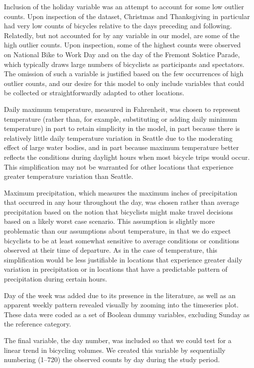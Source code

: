 \documentclass[12pt,letterpaper,article]{memoir} %
\begin{document}
Inclusion of the holiday variable was an attempt to account for
some low outlier counts. Upon inspection of the dataset, Christmas and
Thanksgiving in particular had very low counts of bicycles relative to
the days preceding and following. Relatedly, but not accounted for by
any variable in our model, are some of the high outlier counts. Upon
inspection, some of the highest counts were observed on National Bike
to Work Day and on the day of the Fremont Solstice Parade, which
typically draws large numbers of bicyclists as participants and
spectators. The omission of such a variable is justified based on the
few occurrences of high outlier counts, and our desire for this model
to only include variables that could be collected or straightforwardly
adapted to other locations.

Daily maximum temperature, measured in Fahrenheit, was chosen to
represent temperature (rather than, for example, substituting or
adding daily minimum temperature) in part to retain simplicity in the
model, in part because there is relatively little daily temperature
variation in Seattle due to the moderating effect of large water
bodies, and in part because maximum temperature better reflects the
conditions during daylight hours when most bicycle trips would occur.
This simplification may not be warranted for other locations that
experience greater temperature variation than Seattle.

Maximum precipitation, which measures the maximum inches of
precipitation that occurred in any hour throughout the day, was chosen
rather than average precipitation based on the notion that bicyclists
might make travel decisions based on a likely worst case scenario.
This assumption is slightly more problematic than our assumptions
about temperature, in that we do expect bicyclists to be at least
somewhat sensitive to average conditions or conditions observed at
their time of departure. As in the case of temperature, this
simplification would be less justifiable in locations that experience
greater daily variation in precipitation or in locations that have a
predictable pattern of precipitation during certain hours.

Day of the week was added due to its presence in the literature, as
well as an apparent weekly pattern revealed visually by zooming into
the timeseries plot. These data were coded as a set of Boolean dummy
variables, excluding Sunday as the reference category.

The final variable, the day number, was included so that we could test
for a linear trend in bicycling volumes. We created this variable by
sequentially numbering (1--720) the observed counts by day during the study period.
\end{document}
